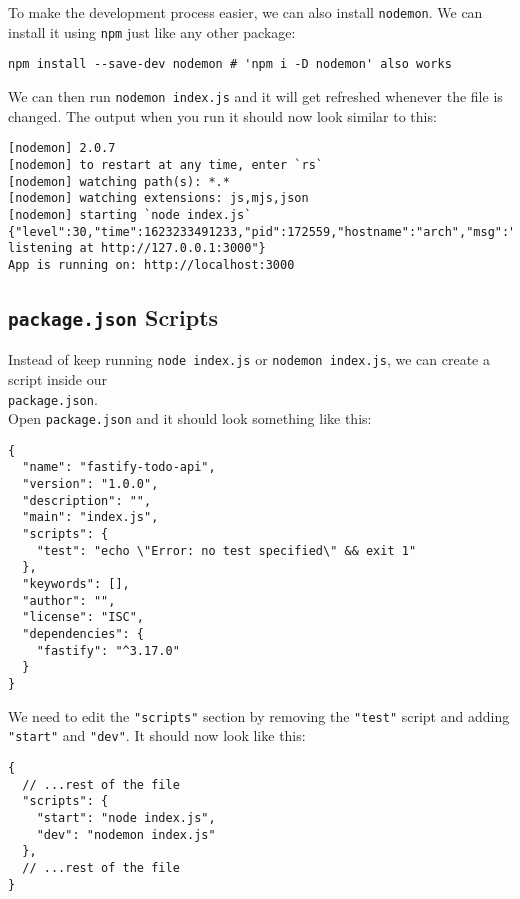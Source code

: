 \documentclass[a4paper,14pt,titlepage]{article}
\def\c#1{\texttt{#1}}
\begin{document}
To make the development process easier, we can also install \c{nodemon}.
We can install it using \c{npm} just like any other package:

\begin{verbatim}
npm install --save-dev nodemon # 'npm i -D nodemon' also works
\end{verbatim}

We can then run \c{nodemon index.js} and it will get refreshed whenever
the file is changed. The output when you run it should now look similar to this:

\begin{verbatim}
[nodemon] 2.0.7
[nodemon] to restart at any time, enter `rs`
[nodemon] watching path(s): *.*
[nodemon] watching extensions: js,mjs,json
[nodemon] starting `node index.js`
{"level":30,"time":1623233491233,"pid":172559,"hostname":"arch","msg":"Server listening at http://127.0.0.1:3000"}
App is running on: http://localhost:3000
\end{verbatim}

\newpage

\subsection{\c{package.json} Scripts}

Instead of keep running \c{node index.js} or \texttt{nodemon index.js}, we
can create a script inside our \\ \c{package.json}.\\

Open \c{package.json} and it should look something like this:

\begin{verbatim}
{
  "name": "fastify-todo-api",
  "version": "1.0.0",
  "description": "",
  "main": "index.js",
  "scripts": {
    "test": "echo \"Error: no test specified\" && exit 1"
  },
  "keywords": [],
  "author": "",
  "license": "ISC",
  "dependencies": {
    "fastify": "^3.17.0"
  }
}
\end{verbatim}

We need to edit the \c{"scripts"} section by removing the \texttt{"test"}
script and adding \c{"start"} and \texttt{"dev"}. It should now look like
this:

\begin{verbatim}
{
  // ...rest of the file
  "scripts": {
    "start": "node index.js",
    "dev": "nodemon index.js"
  },
  // ...rest of the file
}
\end{verbatim}
\end{document}
